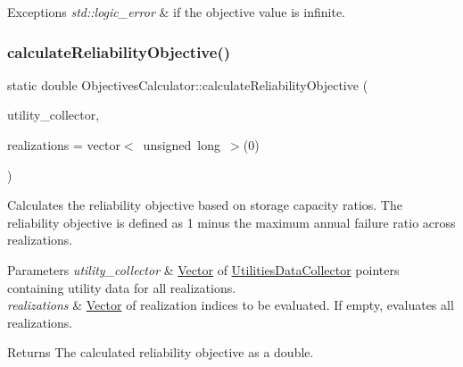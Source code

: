 \begin{DoxyExceptions}{Exceptions}
{\em std\+::logic\+\_\+error} & if the objective value is infinite. \\
\hline
\end{DoxyExceptions}
\mbox{\label{classObjectivesCalculator_a4f34e541d573cc2e0690cfcdd8460c16}} 
\subsubsection{\texorpdfstring{calculate\+Reliability\+Objective()}{calculateReliabilityObjective()}}
{\footnotesize\ttfamily static double Objectives\+Calculator\+::calculate\+Reliability\+Objective (\begin{DoxyParamCaption}\item[{const vector$<$ \mbox{\hyperlink{classUtilitiesDataCollector}{Utilities\+Data\+Collector}} $\ast$$>$ \&}]{utility\+\_\+collector,  }\item[{vector$<$ unsigned long $>$}]{realizations = {\ttfamily vector$<$~unsigned~long~$>$(0)} }\end{DoxyParamCaption})\hspace{0.3cm}{\ttfamily [static]}}



Calculates the reliability objective based on storage capacity ratios. The reliability objective is defined as 1 minus the maximum annual failure ratio across realizations. 


\begin{DoxyParams}{Parameters}
{\em utility\+\_\+collector} & \mbox{\hyperlink{classVector}{Vector}} of {\ttfamily \mbox{\hyperlink{classUtilitiesDataCollector}{Utilities\+Data\+Collector}}} pointers containing utility data for all realizations. \\
\hline
{\em realizations} & \mbox{\hyperlink{classVector}{Vector}} of realization indices to be evaluated. If empty, evaluates all realizations.\\
\hline
\end{DoxyParams}
\begin{DoxyReturn}{Returns}
The calculated reliability objective as a double.
\end{DoxyReturn}

